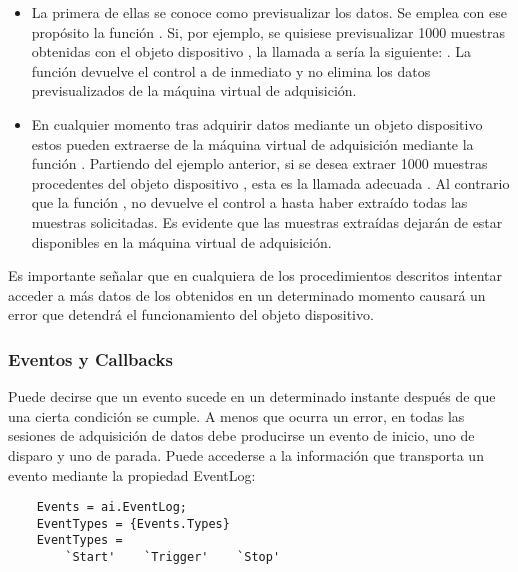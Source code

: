 \begin{itemize}
	\item La primera de ellas se conoce como previsualizar los datos. Se emplea con ese propósito la función . Si, por ejemplo, se quisiese previsualizar 1000 muestras obtenidas con el objeto dispositivo , la llamada a  sería la siguiente: . La función  devuelve el control a \matlab{} de inmediato y no elimina los datos previsualizados de la máquina virtual de adquisición.
	\item En cualquier momento tras adquirir datos mediante un objeto dispositivo estos pueden extraerse de la máquina virtual de adquisición mediante la función . Partiendo del ejemplo anterior, si se desea extraer 1000 muestras procedentes del objeto dispositivo , esta es la llamada adecuada . Al contrario que la función ,  no devuelve el control a \matlab{} hasta haber extraído todas las muestras solicitadas. Es evidente que las muestras extraídas dejarán de estar disponibles en la máquina virtual de adquisición.
\end{itemize}

Es importante señalar que en cualquiera de los procedimientos descritos intentar acceder a más datos de los obtenidos en un determinado momento causará un error que detendrá el funcionamiento del objeto dispositivo.


\subsubsection{Eventos y Callbacks}

Puede decirse que un evento sucede en un determinado instante después de que una cierta condición se cumple. A menos que ocurra un error, en todas las sesiones de adquisición de datos debe producirse un evento de inicio, uno de disparo y uno de parada. Puede accederse a la información que transporta un evento mediante la propiedad \textsf{EventLog}:

\begin{lstlisting}
	Events = ai.EventLog;
	EventTypes = {Events.Types}
	EventTypes =
		`Start'    `Trigger'	`Stop'
\end{lstlisting}

